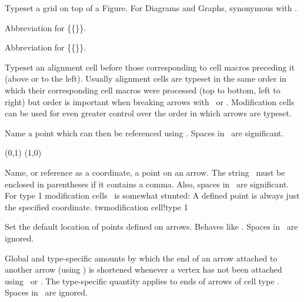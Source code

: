 Typeset a grid on top of a Figure.
For Diagrams and Graphs, synonymous with \csq\gridlines.
\endentry

\mod{}
Abbreviation for \csq\hd\{\csq\phantom\{\math\}\}.
\endentry

\mod{}
Abbreviation for \csq\tl\{\csq\phantom\{\math\}\}.
\endentry

\mod{}
Typeset an alignment cell before those corresponding to cell macros
preceding it (above or to the left).
Usually alignment cells are typeset in the same order in which
their corresponding cell macros were processed (top to bottom, left to right)
but order is important when breaking arrows with \csq\br\ or \csq\rl.
Modification cells can be used for even greater control over the order in which
arrows are typeset.
\endentry

Name a point which can then be referenced using \csq\pt.
Spaces in \name\ are significant.

\side
\Graph{2cm}{15mm}
 (0,1)
 (1,0)
\To {}   
\endGraph
\endside
\endentry

\mod{}
Name, or reference as a coordinate, a point on an arrow.
The string \name\ must be enclosed in parentheses if it contains a comma.
Also, spaces in \name\ are significant.
For type 1 modification cells \csq\pt\ is somewhat stunted: A defined point
is always just the specified coordinate.
\sindex tw{modification cell!type 1}
\endentry

Set the default location of points defined on arrows. Behaves like
\csq{}. Spaces in \type\ are ignored.
\endentry

Global and type-specific amounts by which the end of an arrow attached
to another arrow (using \csq\pt) is shortened whenever a vertex has not been
attached using \csq\hd\ or \csq\tl.
The type-specific quantity applies to ends of arrows of cell type \type.
Spaces in \type\ are ignored.
\endentry

